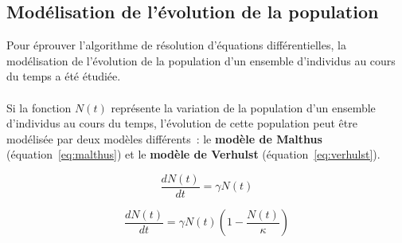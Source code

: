 \documentclass{article}
\begin{document}
\subsection{Modélisation de l'évolution de la population}
Pour éprouver l'algorithme de résolution d'équations différentielles, la modélisation de l'évolution de la population d'un ensemble d'individus au cours du temps a été étudiée.\\ \\
Si la fonction $N(t)$ représente la variation de la population d’un ensemble d’individus au cours du temps, l’évolution de cette population peut être modélisée par deux modèles différents~: le \textbf{modèle de Malthus} (équation~\ref{eq:malthus}) et le \textbf{modèle de Verhulst} (équation~\ref{eq:verhulst}).\\
\begin{minipage}{0.48\textwidth}
  \begin{equation}
    \label{eq:malthus}
    \frac{dN(t)}{dt} = \gamma N(t)
  \end{equation}
\end{minipage}
\hfill
\begin{minipage}{0.48\textwidth}
  \begin{equation}
    \label{eq:verhulst}
    \frac{dN(t)}{dt} = \gamma N(t) \left(1 - \frac{N(t)}{\kappa}\right)
  \end{equation}
  \\
\end{minipage}
\end{document}
